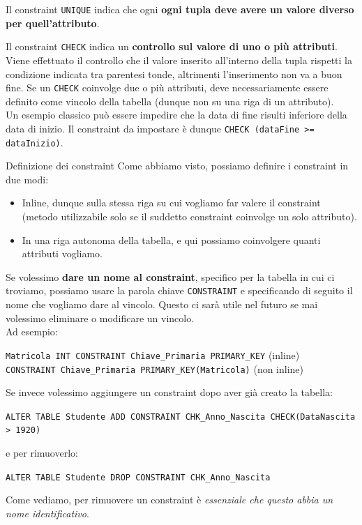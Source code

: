 \documentclass[12pt]{report}
\begin{document}
	Il constraint \texttt{UNIQUE} indica che ogni \textbf{ogni tupla deve avere un valore diverso per quell'attributo}.
	
	Il constraint \texttt{CHECK} indica un \textbf{controllo sul valore di uno o più attributi}. Viene effettuato il controllo che il valore inserito all'interno della tupla rispetti la condizione indicata tra parentesi tonde, altrimenti l'inserimento non va a buon fine. Se un \texttt{CHECK} coinvolge due o più attributi, deve necessariamente essere definito come vincolo della tabella (dunque non su una riga di un attributo).\\
	Un esempio classico può essere impedire che la data di fine risulti inferiore della data di inizio. Il constraint da impostare è dunque \texttt{CHECK (dataFine >= dataInizio)}.
	
	\begin{proposizione}{Definizione dei constraint}{}
		Come abbiamo visto, possiamo definire i constraint in due modi:
		\begin{itemize}
			\item Inline, dunque sulla stessa riga su cui vogliamo far valere il constraint (metodo utilizzabile solo se il suddetto constraint coinvolge un solo attributo).
			
			\item In una riga autonoma della tabella, e qui possiamo coinvolgere quanti attributi vogliamo.
		\end{itemize}
		Se volessimo \textbf{dare un nome al constraint}, specifico per la tabella in cui ci troviamo, possiamo usare la parola chiave \texttt{CONSTRAINT} e specificando di seguito il nome che vogliamo dare al vincolo. Questo ci sarà utile nel futuro se mai volessimo eliminare o modificare un vincolo.\\
		Ad esempio:
		\begin{center}
			\texttt{Matricola INT CONSTRAINT Chiave\_Primaria PRIMARY\_KEY} (inline)\\
			\texttt{CONSTRAINT Chiave\_Primaria PRIMARY\_KEY(Matricola)} (non inline)
		\end{center}
		\smallbreak
		
		Se invece volessimo aggiungere un constraint dopo aver già creato la tabella:
		\begin{center}
			\texttt{ALTER TABLE Studente ADD CONSTRAINT CHK\_Anno\_Nascita CHECK(DataNascita > 1920)}
		\end{center}
		e per rimuoverlo:
		\begin{center}
			\texttt{ALTER TABLE Studente DROP CONSTRAINT CHK\_Anno\_Nascita}
		\end{center}
		Come vediamo, per rimuovere un constraint è \textit{essenziale che questo abbia un nome identificativo}.
	\end{proposizione}
	
\end{document}
